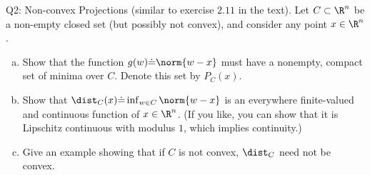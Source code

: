 \documentclass{article}
\theoremstyle{plain}
\theoremstyle{definition}
\theoremstyle{remark}
\begin{document}
\begin{problem}
    {Q2: Non-convex Projections (similar to exercise $2.11$ in the text).}
    Let $C\subset\R^n$ be a non-empty closed set (but possibly not convex), and consider any point $x\in\R^n$.
    \begin{enumerate}[(a)]
        \item Show that the function $g(w)\dot{=}\norm{w-x}$ must have a nonempty, compact set of minima over $C$. Denote this set by $P_C(x)$.
        \item Show that $\dist_C(x)\dot{=}\inf_{w\in C}\norm{w-x}$ is an everywhere finite-valued and continuous function of $x\in\R^n$. (If you like, you can show that it is Lipschitz continuous with modulus $1$, which implies continuity.)
        \item Give an example showing that if $C$ is not convex, $\dist_C$ need not be convex.
    \end{enumerate}
\end{problem}
\end{document}
